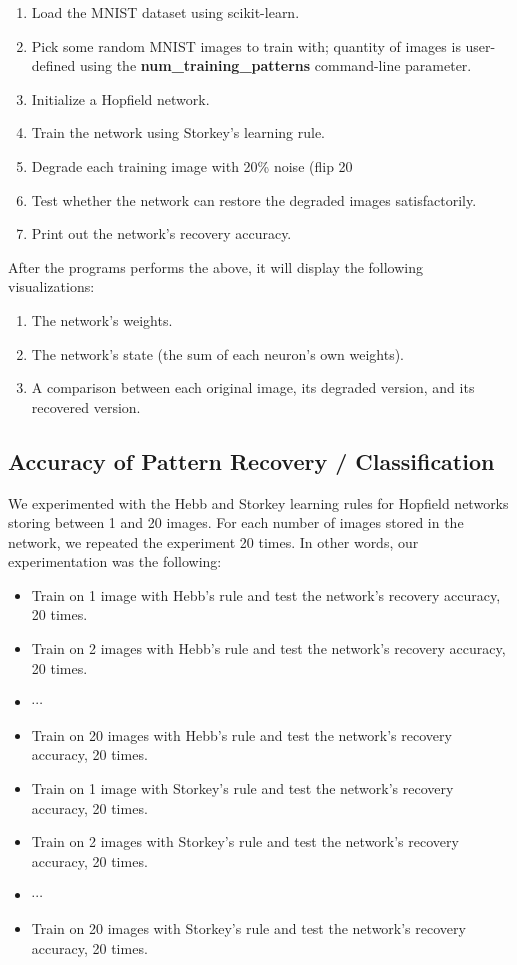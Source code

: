 \documentclass[11pt]{article}
\providecommand{\tightlist}{%
  \setlength{\itemsep}{0pt}\setlength{\parskip}{0pt}}
\begin{document}
\begin{enumerate}
	\def\labelenumi{\arabic{enumi}.}
	\tightlist
	\item Load the MNIST dataset using scikit-learn.
	\item Pick some random MNIST images to train with; quantity of images is user-defined using the \textbf{num\_training\_patterns} command-line parameter.
	\item Initialize a Hopfield network.
	\item Train the network using Storkey's learning rule.
	\item Degrade each training image with 20\% noise (flip 20%
	\item Test whether the network can restore the degraded images satisfactorily.
	\item Print out the network's recovery accuracy.
\end{enumerate}

After the programs performs the above, it will display the following
visualizations:

\begin{enumerate}
	\def\labelenumi{\arabic{enumi}.}
	\tightlist
	\item The network's weights.
	\item The network's state (the sum of each neuron's own weights).
	\item A comparison between each original image, its degraded version, and its recovered version.
\end{enumerate}

\subsection{Accuracy of Pattern Recovery / Classification}\label{accuracy-of-pattern-recovery-classification}

We experimented with the Hebb and Storkey learning rules for Hopfield
networks storing between 1 and 20 images. For each number of images
stored in the network, we repeated the experiment 20 times. In other
words, our experimentation was the following:

\begin{itemize}
\item
  Train on 1 image with Hebb's rule and test the network's
  recovery accuracy, 20 times.
\item
  Train on 2 images with Hebb's rule and test the network's
  recovery accuracy, 20 times.
\item
  \(\cdots\)
\item
  Train on 20 images with Hebb's rule and test the network's
  recovery accuracy, 20 times.
\item
  Train on 1 image with Storkey's rule and test the network's
  recovery accuracy, 20 times.
\item
  Train on 2 images with Storkey's rule and test the network's
  recovery accuracy, 20 times.
\item
  \(\cdots\)
\item
  Train on 20 images with Storkey's rule and test the network's
  recovery accuracy, 20 times.
\end{itemize}
\end{document}
